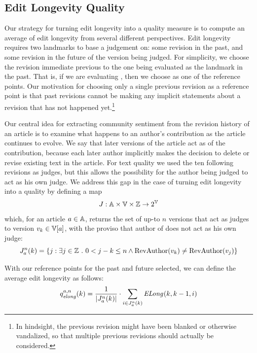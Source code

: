 \subsection{Edit Longevity Quality}

Our strategy for turning edit longevity into a quality measure
is to compute an average of edit longevity from several different
perspectives.
Edit longevity requires two landmarks to base a judgement on:
some revision in the past, and some revision in the future of
the version being judged.
For simplicity, we choose the revision immediate previous to
the one being evaluated as the landmark in the past.
That is, if we are evaluating , then we choose
 as one of the reference points.
Our motivation for choosing only a single previous revision
as a reference point is that past revisions cannot be making
any implicit statements about a revision that has not happened
yet.\footnote{In hindsight, the previous revision might have been
blanked or otherwise vandalized, so that multiple previous revisions
should actually be considered.}

Our central idea for extracting community sentiment from the
revision history of an article is to examine what happens to an
author's contribution as the article continues to evolve.
We say that later versions of the article act as 
of the contribution, because each later author implicitly makes
the decision to delete or revise existing text in the article.
For text quality we used the ten following revisions as judges,
but this allows the possibility for the author being judged
to act as his own judge.
We address this gap in the case of turning edit longevity into
a quality by defining a map
\begin{equation*}
J : \articles \times \versions{} \times \mathbb{Z} \to 2^\versions{}
\end{equation*}
which, for an article $a \in \mathbb{A}$,
returns the set of up-to $n$ versions that act as judges
to version $\version{k} \in \versions{a}$, with the proviso
that author of  does not act as his own judge:
\begin{equation}
\judges{a}{n}{k} = \{ j : \exists j \in \mathbb{Z}\ .\ 0 < j - k \le n
    \wedge \revauthor{\version{k}} \ne \revauthor{\version{j}} \}
\label{def:judges}
\end{equation}

With our reference points for the past and future selected, we
can define the average edit longevity as follows:
\begin{equation}
\quality{elong}{a,n}{k} = \frac{1}{|\judges{a}{n}{k}|} \cdot
      \sum_{i \in \judges{a}{n}{k}} \esurv{}{k,k-1,i}
\label{def:elong}
\end{equation}

